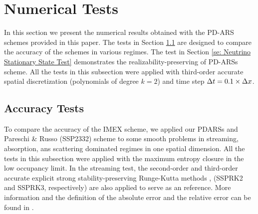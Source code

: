 \section{Numerical Tests}\label{se:NumericalTests}

In this section we present the numerical results obtained with the PD-ARS schemes provided in this paper.
The tests in Section \ref{se: Accuracy Tests} are designed to compare the accuracy of the schemes in various regimes.
The test in Section \ref{se: Neutrino Stationary State Test} demonstrates the realizability-preserving of PD-ARSs scheme.
All the tests in this subsection were applied with third-order accurate spatial discretization (polynomials of degree $k=2$) and time step $\Delta t = 0.1 \times \Delta x $.
\subsection{Accuracy Tests}
\label{se: Accuracy Tests}
To compare the accuracy of the IMEX scheme, we applied our PDARSs and Pareschi \& Russo \cite{pareschiRusso_2005} (SSP2332) scheme to some smooth problems in streaming, absorption, ans scattering dominated regimes in one spatial dimension.
All the tests in this subsection were applied with the maximum entropy closure in the low occupancy limit.
In the streaming test, the second-order and third-order accurate explicit strong stability-preserving Runge-Kutta methods\cite{gottlieb_etal_2001} , (SSPRK2 and SSPRK3, respectively) are also applied to serve as an reference.
More information and the definition of the absolute error and the relative error can be found in \cite{chu_2018}.

